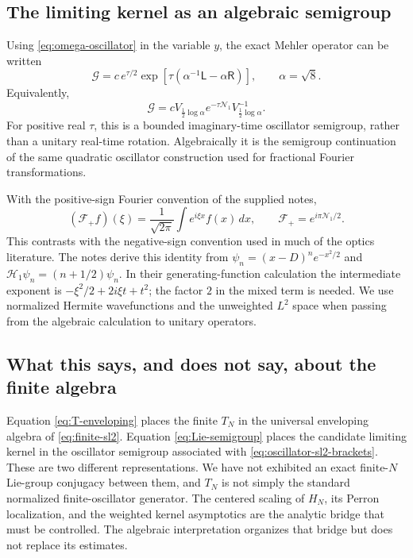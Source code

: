 \documentclass[11pt,reqno]{amsart}
\theoremstyle{definition}\newtheorem{definition}[theorem]{Definition}
\theoremstyle{remark}\newtheorem{remark}[theorem]{Remark}
\begin{document}
\subsection{The limiting kernel as an algebraic semigroup}
Using \eqref{eq:omega-oscillator} in the variable $y$, the exact
Mehler operator can be written
\begin{equation}\label{eq:Lie-semigroup}
\boxed{
\mathcal G=c\,e^{\tau/2}
\exp\left[\tau(\alpha^{-1}\mathsf L-\alpha\mathsf R)\right],
\qquad \alpha=\sqrt8.
}
\end{equation}
Equivalently,
\[
\mathcal G=cV_{\frac12\log\alpha}
 e^{-\tau\mathcal N_1}V_{\frac12\log\alpha}^{-1}.
\]
For positive real $\tau$, this is a bounded imaginary-time oscillator
semigroup, rather than a unitary real-time rotation. Algebraically it
is the semigroup continuation of the same quadratic oscillator
construction used for fractional Fourier transformations.

With the positive-sign Fourier convention of the supplied notes,
\[
(\mathcal F_+f)(\xi)=\frac1{\sqrt{2\pi}}\int e^{i\xi x}f(x)\,dx,
\qquad
\mathcal F_+=e^{i\pi\mathcal N_1/2}.
\]
This contrasts with the negative-sign convention used in much of the
optics literature. The notes derive this identity from
$\psi_n=(x-D)^ne^{-x^2/2}$ and
$\mathscr H_1\psi_n=(n+1/2)\psi_n$.
In their generating-function calculation the intermediate exponent
is $-\xi^2/2+2i\xi t+t^2$; the factor $2$ in the mixed term is needed.
We use normalized Hermite wavefunctions and the unweighted $L^2$ space
when passing from the algebraic calculation to unitary operators.

\subsection{What this says, and does not say, about the finite algebra}
Equation \eqref{eq:T-enveloping} places the finite $T_N$ in the universal
enveloping algebra of \eqref{eq:finite-sl2}. Equation
\eqref{eq:Lie-semigroup} places the candidate limiting kernel in the
oscillator semigroup associated with \eqref{eq:oscillator-sl2-brackets}.
These are two different representations. We have not exhibited an
exact finite-$N$ Lie-group conjugacy between them, and $T_N$ is not
simply the standard normalized finite-oscillator generator.
The centered scaling of $H_N$, its Perron localization, and the
weighted kernel asymptotics are the analytic bridge that must be
controlled. The algebraic interpretation organizes that bridge but
does not replace its estimates.
\end{document}
